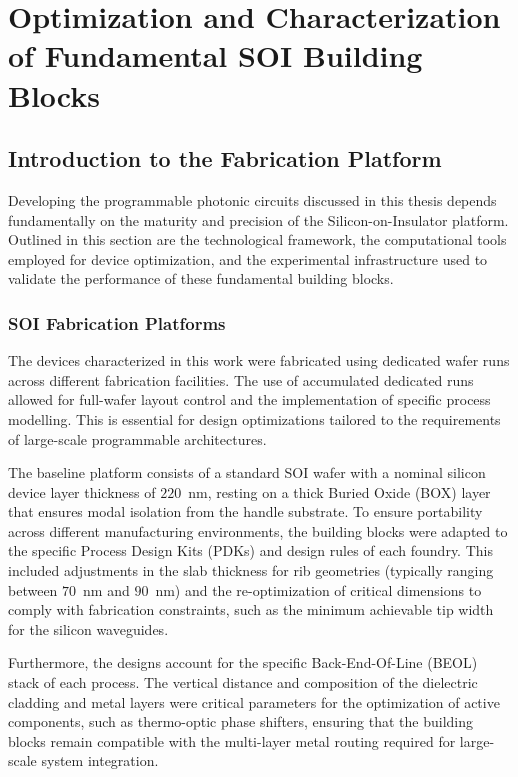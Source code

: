 

\chapter{Optimization and Characterization of Fundamental SOI Building Blocks}\label{chap:blocks} %

\section{Introduction to the Fabrication Platform} \label{sec:fabrication_platform}

Developing the programmable photonic circuits discussed in this thesis depends fundamentally on the 
maturity and precision of the Silicon-on-Insulator platform. Outlined in this section are the 
technological framework, the computational tools employed for device optimization, and the 
experimental infrastructure used to validate the performance of these fundamental building blocks.

\subsection{SOI Fabrication Platforms} \label{subsec:foundry}

The devices characterized in this work were fabricated using dedicated wafer runs across different 
fabrication facilities. The use of accumulated dedicated runs allowed for full-wafer layout control 
and the implementation of specific process modelling. This is essential for design optimizations 
tailored to the requirements of large-scale programmable architectures. 

The baseline platform consists of a standard SOI wafer with a nominal silicon device layer 
thickness of $220$~nm, resting on a thick Buried Oxide (BOX) layer that ensures modal isolation 
from the handle substrate. To ensure portability across different manufacturing environments, the 
building blocks were adapted to the specific Process Design Kits (PDKs) and design rules of each 
foundry. This included adjustments in the slab thickness for rib geometries (typically ranging 
between $70$~nm and $90$~nm) and the re-optimization of critical dimensions to comply with 
fabrication constraints, such as the minimum achievable tip width for the silicon waveguides.

Furthermore, the designs account for the specific Back-End-Of-Line (BEOL) stack of each process. 
The vertical distance and composition of the dielectric cladding and metal layers were critical 
parameters for the optimization of active components, such as thermo-optic phase shifters, ensuring 
that the building blocks remain compatible with the multi-layer metal routing required for 
large-scale system integration.

